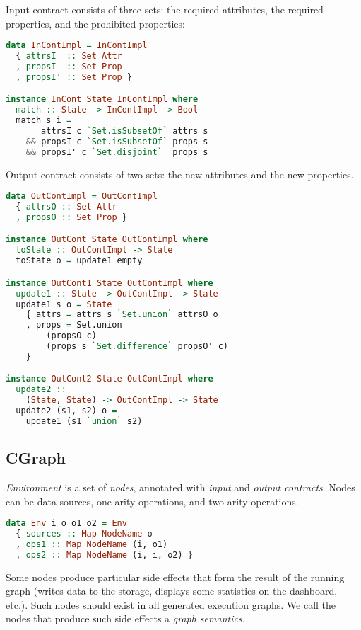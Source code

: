 Input contract consists of three sets: the required attributes, the required properties, and the prohibited properties:

\begin{lstlisting}[language=Haskell]
data InContImpl = InContImpl
  { attrsI  :: Set Attr
  , propsI  :: Set Prop
  , propsI' :: Set Prop }

instance InCont State InContImpl where
  match :: State -> InContImpl -> Bool
  match s i =
       attrsI c `Set.isSubsetOf` attrs s
    && propsI c `Set.isSubsetOf` props s
    && propsI' c `Set.disjoint`  props s
\end{lstlisting}

Output contract consists of two sets: the new attributes and the new properties.

\begin{lstlisting}[language=Haskell]
data OutContImpl = OutContImpl
  { attrsO :: Set Attr
  , propsO :: Set Prop }

instance OutCont State OutContImpl where
  toState :: OutContImpl -> State
  toState o = update1 empty

instance OutCont1 State OutContImpl where
  update1 :: State -> OutContImpl -> State
  update1 s o = State
    { attrs = attrs s `Set.union` attrsO o
    , props = Set.union
        (propsO c)
        (props s `Set.difference` propsO' c)
    }

instance OutCont2 State OutContImpl where
  update2 :: 
    (State, State) -> OutContImpl -> State
  update2 (s1, s2) o = 
    update1 (s1 `union` s2)
\end{lstlisting}

\subsection{CGraph}

{\em Environment} is a set of {\em nodes}, annotated with {\em input} and {\em output contracts}.
Nodes can be data sources, one-arity operations, and two-arity operations.

\begin{lstlisting}[language=Haskell]
data Env i o o1 o2 = Env
  { sources :: Map NodeName o
  , ops1 :: Map NodeName (i, o1)
  , ops2 :: Map NodeName (i, i, o2) }
\end{lstlisting}

Some nodes produce particular side effects that form the result of the running graph (writes data to the storage, displays some statistics on the dashboard, etc.).
Such nodes should exist in all generated execution graphs.
We call the nodes that produce such side effects a {\em graph semantics}.

